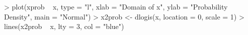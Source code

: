 \begin{Schunk}
\begin{Sinput}
> plot(xprob ~ x, type = "l", xlab = "Domain of x", ylab = "Probability Density", main = "Normal")
> x2prob <- dlogis(x, location = 0, scale = 1)
> lines(x2prob ~ x, lty = 3, col = "blue")
\end{Sinput}
\end{Schunk}
